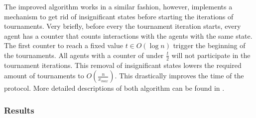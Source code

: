 The improved algorithm works in a similar fashion, however, implements a mechanism to get rid of insignificant states before starting the iterations of tournaments. Very briefly, before every the tournament iteration starts, every agent has a counter that counts interactions with the agents with the same state. The first counter to reach a fixed value $t \in O(\log n)$ trigger the beginning of the tournaments. All agents with a counter of under $\frac{t}{2}$ will not participate in the tournament iterations. This removal of insignificant states lowers the required amount of tournaments to $O(\frac{n}{x_{max}})$. This drastically improves the time of the protocol. More detailed descriptions of both algorithm can be found in \cite{bankhamerPopulationProtocolsExact2022}.

\subsubsection{Results}


